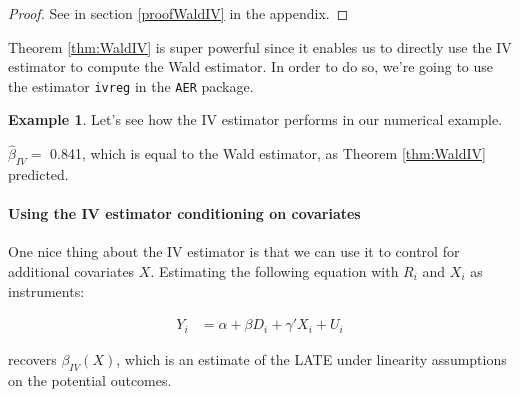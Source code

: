 \documentclass[
]{book}
\newenvironment{Shaded}{\begin{snugshade}}{\end{snugshade}}
\newcommand{\DecValTok}[1]{\textcolor[rgb]{0.00,0.00,0.81}{#1}}
\newcommand{\FloatTok}[1]{\textcolor[rgb]{0.00,0.00,0.81}{#1}}
\newcommand{\FunctionTok}[1]{\textcolor[rgb]{0.00,0.00,0.00}{#1}}
\newcommand{\NormalTok}[1]{#1}
\newcommand{\OtherTok}[1]{\textcolor[rgb]{0.56,0.35,0.01}{#1}}
\newcommand{\SpecialCharTok}[1]{\textcolor[rgb]{0.00,0.00,0.00}{#1}}
\theoremstyle{definition}
\theoremstyle{definition}
\newtheorem{example}{Example}[chapter]
\theoremstyle{definition}
\theoremstyle{definition}
\theoremstyle{remark}
\begin{document}
\begin{proof}
\iffalse{} {Proof. } \fi{}See in section \ref{proofWaldIV} in the appendix.
\end{proof}

Theorem \ref{thm:WaldIV} is super powerful since it enables us to directly use the IV estimator to compute the Wald estimator.
In order to do so, we're going to use the estimator \texttt{ivreg} in the \texttt{AER} package.

\begin{example}
\protect\hypertarget{exm:unnamed-chunk-124}{}{\label{exm:unnamed-chunk-124} }Let's see how the IV estimator performs in our numerical example.
\end{example}

\begin{Shaded}
\end{Shaded}

\(\hat{\beta}_{IV}=\) 0.841, which is equal to the Wald estimator, as Theorem \ref{thm:WaldIV} predicted.

\hypertarget{using-the-iv-estimator-conditioning-on-covariates}{%
\paragraph{Using the IV estimator conditioning on covariates}\label{using-the-iv-estimator-conditioning-on-covariates}}

One nice thing about the IV estimator is that we can use it to control for additional covariates \(X\).
Estimating the following equation with \(R_i\) and \(X_i\) as instruments:

\begin{align*}
    Y_i &  = \alpha +  \beta D_i + \gamma' X_i + U_i
  \end{align*}

recovers \(\beta_{IV}(X)\), which is an estimate of the LATE under linearity assumptions on the potential outcomes.
\end{document}
